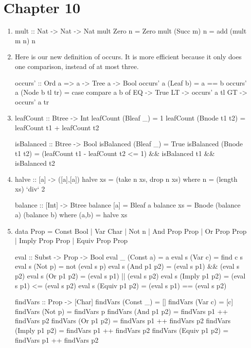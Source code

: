 \documentclass{article}
\begin{document}
\section{Chapter 10}
\begin{enumerate}
\item 
\begin{code}
mult :: Nat -> Nat -> Nat
mult Zero n     = Zero
mult (Succ m) n = add (mult m n) n
\end{code}

\item Here is our new definition of occurs. It is more efficient because it only does one comparison, instead of at most three. 
\begin{code}
occurs' :: Ord a => a -> Tree a -> Bool
occurs' a (Leaf b) = a == b
occurs' a (Node b tl tr) = case compare a b of
                           EQ -> True
                           LT -> occurs' a tl
                           GT -> occurs' a tr
\end{code}

\item
\begin{code}
leafCount :: Btree -> Int
leafCount (Bleaf _)     = 1
leafCount (Bnode t1 t2) = leafCount t1 + leafCount t2

isBalanced :: Btree -> Bool
isBalanced (Bleaf _)     = True
isBalanced (Bnode t1 t2) = (leafCount t1 - leafCount t2 <= 1) && isBalanced t1 && isBalanced t2
\end{code}

\item
\begin{code}
halve :: [a] -> ([a],[a])
halve xs = (take n xs, drop n xs) where n = (length xs) `div` 2

balance :: [Int] -> Btree
balance [a] = Bleaf a
balance xs  = Bnode (balance a) (balance b) where (a,b) = halve xs
\end{code}

\item 
\begin{code}
data Prop = Const Bool
          | Var Char
          | Not  n
          | And Prop Prop
          | Or Prop Prop
          | Imply Prop Prop
          | Equiv Prop Prop

eval :: Subst -> Prop -> Bool
eval _ (Const a)     = a
eval s (Var c)       = find c s
eval s (Not p)       = not (eval s p)
eval s (And p1 p2)   = (eval s p1) && (eval s p2)
eval s (Or p1 p2)    = (eval s p1) || (eval s p2)
eval s (Imply p1 p2) = (eval s p1) <= (eval s p2)
eval s (Equiv p1 p2) = (eval s p1) == (eval s p2)

findVars :: Prop -> [Char]
findVars (Const _)     = []
findVars (Var c)       = [c]
findVars (Not p)       = findVars p
findVars (And p1 p2)   = findVars p1 ++ findVars p2
findVars (Or p1 p2)    = findVars p1 ++ findVars p2
findVars (Imply p1 p2) = findVars p1 ++ findVars p2
findVars (Equiv p1 p2) = findVars p1 ++ findVars p2
\end{code}

\end{enumerate}
\end{document}
